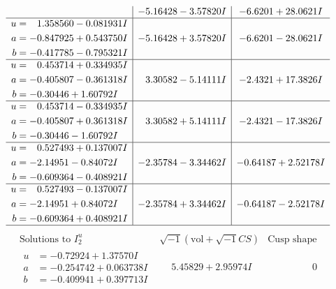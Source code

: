 \documentclass[1p]{elsarticle_modified}
\theoremstyle{definition}
\newcommand{\I}{\sqrt{-1}}
\begin{document}
$$\begin{array}{c|c|c}
 & -5.16428 - 3.57820 I & -6.6201 + 28.0621 I \\ \hline\begin{aligned}
u &= \phantom{-}1.358560 - 0.081931 I \\
a &= -0.847925 + 0.543750 I \\
b &= -0.417785 - 0.795321 I\end{aligned}
 & -5.16428 + 3.57820 I & -6.6201 - 28.0621 I \\ \hline\begin{aligned}
u &= \phantom{-}0.453714 + 0.334935 I \\
a &= -0.405807 - 0.361318 I \\
b &= -0.30446 + 1.60792 I\end{aligned}
 & \phantom{-}3.30582 - 5.14111 I & -2.4321 + 17.3826 I \\ \hline\begin{aligned}
u &= \phantom{-}0.453714 - 0.334935 I \\
a &= -0.405807 + 0.361318 I \\
b &= -0.30446 - 1.60792 I\end{aligned}
 & \phantom{-}3.30582 + 5.14111 I & -2.4321 - 17.3826 I \\ \hline\begin{aligned}
u &= \phantom{-}0.527493 + 0.137007 I \\
a &= -2.14951 - 0.84072 I \\
b &= -0.609364 - 0.408921 I\end{aligned}
 & -2.35784 - 3.34462 I & -0.64187 + 2.52178 I \\ \hline\begin{aligned}
u &= \phantom{-}0.527493 - 0.137007 I \\
a &= -2.14951 + 0.84072 I \\
b &= -0.609364 + 0.408921 I\end{aligned}
 & -2.35784 + 3.34462 I & -0.64187 - 2.52178 I\\
 \hline 
 \end{array}$$\newpage$$\begin{array}{c|c|c}  
\text{Solutions to }I^u_{2}& \I (\text{vol} + \sqrt{-1}CS) & \text{Cusp shape}\\
 \hline 
\begin{aligned}
u &= -0.72924 + 1.37570 I \\
a &= -0.254742 + 0.063738 I \\
b &= -0.409941 + 0.397713 I\end{aligned}
 & \phantom{-}5.45829 + 2.95974 I & \phantom{-0.000000 } 0 \\ \hline\begin{aligned}

\end{aligned}
\end{array}$$
\end{document}

